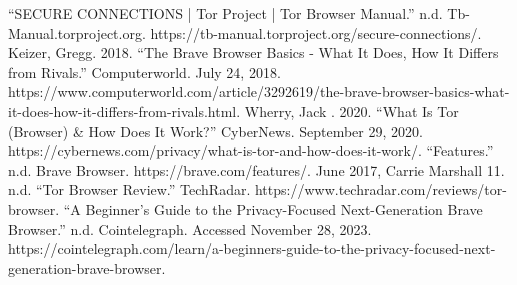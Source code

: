 \documentclass[conference]{IEEEtran}
\begin{document}
\begin{thebibliography}{00}
     “SECURE CONNECTIONS | Tor Project | Tor Browser Manual.” n.d. Tb-Manual.torproject.org. \newline
    https://tb-manual.torproject.org/secure-connections/.
     Keizer, Gregg. 2018. “The Brave Browser Basics - What It Does, How It Differs from Rivals.” Computerworld. July 24, 2018. \newline 
    https://www.computerworld.com/article/3292619/the-brave-browser-basics-what-it-does-how-it-differs-from-rivals.html.
     Wherry, Jack . 2020. “What Is Tor (Browser) \& How Does It Work?” CyberNews. September 29, 2020. \newline
    https://cybernews.com/privacy/what-is-tor-and-how-does-it-work/.
     “Features.” n.d. Brave Browser. https://brave.com/features/.
     June 2017, Carrie Marshall 11. n.d. “Tor Browser Review.” TechRadar. https://www.techradar.com/reviews/tor-browser.
     “A Beginner's Guide to the Privacy-Focused Next-Generation Brave Browser.” n.d. Cointelegraph. Accessed November 28, 2023. \newline
    https://cointelegraph.com/learn/a-beginners-guide-to-the-privacy-focused-next-generation-brave-browser.
\end{thebibliography}
    
\end{document}
